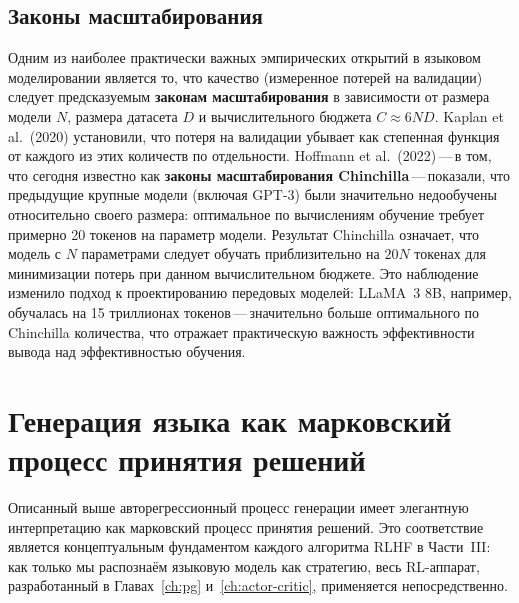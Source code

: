 \subsection{Законы масштабирования}

Одним из наиболее практически важных эмпирических открытий в языковом моделировании является то, что качество (измеренное потерей на валидации) следует предсказуемым \textbf{законам масштабирования} в зависимости от размера модели $N$, размера датасета $D$ и вычислительного бюджета $C \approx 6ND$. Kaplan et al.\ (2020) установили, что потеря на валидации убывает как степенная функция от каждого из этих количеств по отдельности. Hoffmann et al.\ (2022)\,---\,в том, что сегодня известно как \textbf{законы масштабирования Chinchilla}\,---\,показали, что предыдущие крупные модели (включая GPT-3) были значительно недообучены относительно своего размера: оптимальное по вычислениям обучение требует примерно 20 токенов на параметр модели. Результат Chinchilla означает, что модель с $N$ параметрами следует обучать приблизительно на $20N$ токенах для минимизации потерь при данном вычислительном бюджете. Это наблюдение изменило подход к проектированию передовых моделей: LLaMA~3 8B, например, обучалась на 15 триллионах токенов\,---\,значительно больше оптимального по Chinchilla количества, что отражает практическую важность эффективности вывода над эффективностью обучения.

\section{Генерация языка как марковский процесс принятия решений}
\label{sec:lm-mdp}

Описанный выше авторегрессионный процесс генерации имеет элегантную интерпретацию как марковский процесс принятия решений. Это соответствие является концептуальным фундаментом каждого алгоритма RLHF в Части~III: как только мы распознаём языковую модель как стратегию, весь RL-аппарат, разработанный в Главах~\ref{ch:pg} и~\ref{ch:actor-critic}, применяется непосредственно.

